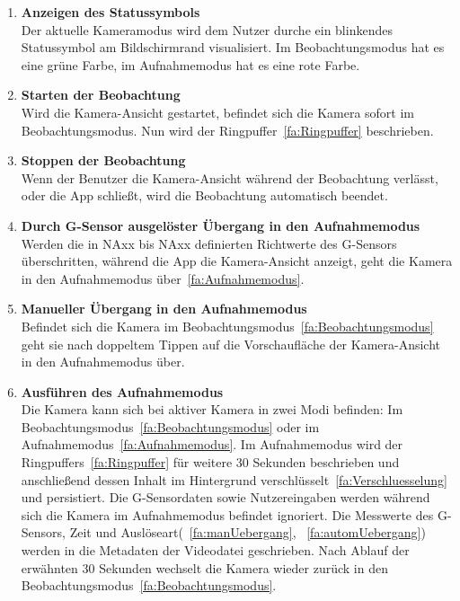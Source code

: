\begin{enumerate}
\item \label{fa:Statussymbol}\textbf{Anzeigen des Statussymbols} \hfill \\
Der aktuelle Kameramodus wird dem Nutzer durche ein blinkendes Statussymbol am Bildschirmrand visualisiert. Im Beobachtungsmodus hat es eine grüne Farbe, im Aufnahmemodus hat es eine rote Farbe.

\item \label{fa:camStart}\textbf{Starten der Beobachtung} \hfill \\
Wird die Kamera-Ansicht gestartet, befindet sich die Kamera sofort im Beobachtungsmodus. Nun wird der Ringpuffer~\eqref{fa:Ringpuffer} beschrieben.

\item \textbf{Stoppen der Beobachtung} \hfill \\
Wenn der Benutzer die Kamera-Ansicht während der Beobachtung verlässt, oder die App schließt, wird die Beobachtung automatisch beendet.

\item \label{fa:automUebergang}\textbf{Durch G-Sensor ausgelöster Übergang in den Aufnahmemodus} \hfill \\
Werden die in NAxx bis NAxx definierten Richtwerte des G-Sensors überschritten, während die App die Kamera-Ansicht anzeigt, geht die Kamera in den Aufnahmemodus über~\eqref{fa:Aufnahmemodus}. 

\item \label{fa:manUebergang}\textbf{Manueller Übergang in den Aufnahmemodus} \hfill \\
Befindet sich die Kamera im Beobachtungsmodus~\eqref{fa:Beobachtungsmodus} geht sie nach doppeltem Tippen auf die Vorschaufläche der Kamera-Ansicht in den Aufnahmemodus über.

\item \label{fa:Aufnahmemodus}\textbf{Ausführen des Aufnahmemodus} \hfill \\
Die Kamera kann sich bei aktiver Kamera in zwei Modi befinden: Im Beobachtungsmodus~\eqref{fa:Beobachtungsmodus} oder im Aufnahmemodus~\eqref{fa:Aufnahmemodus}.
Im Aufnahmemodus wird der Ringpuffers~\eqref{fa:Ringpuffer} für weitere 30 Sekunden beschrieben und anschließend dessen Inhalt im Hintergrund verschlüsselt~\eqref{fa:Verschluesselung} und persistiert. Die G-Sensordaten sowie Nutzereingaben werden während sich die Kamera im Aufnahmemodus befindet ignoriert. Die Messwerte des G-Sensors, Zeit und Auslöseart(~\eqref{fa:manUebergang}, ~\eqref{fa:automUebergang}) werden in die Metadaten der Videodatei geschrieben. Nach Ablauf der erwähnten 30 Sekunden wechselt die Kamera wieder zurück in den Beobachtungsmodus~\eqref{fa:Beobachtungsmodus}.


\end{enumerate}
